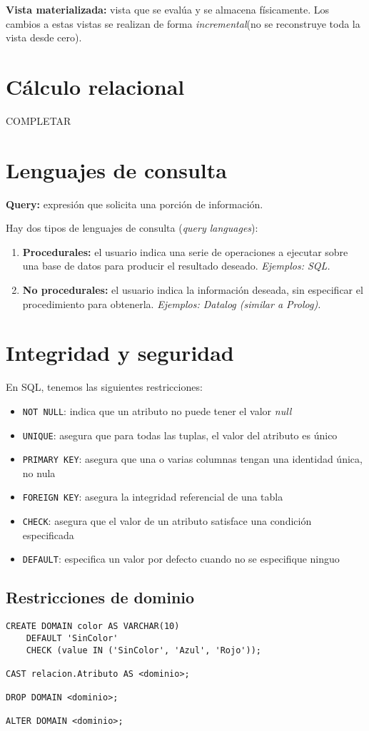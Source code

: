 \documentclass[a4paper, twoside]{article}
\begin{document}
\textbf{Vista materializada:} vista que se evalúa y se almacena físicamente. Los cambios a estas vistas se realizan de forma \emph{incremental}(no se reconstruye toda la vista desde cero).

\section{Cálculo relacional}
COMPLETAR

\section{Lenguajes de consulta}
\textbf{Query:} expresión que solicita una porción de información.

Hay dos tipos de lenguajes de consulta (\emph{query languages}):
\begin{enumerate}
	\item \textbf{Procedurales:} el usuario indica una serie de operaciones a ejecutar sobre una base de datos para producir el resultado deseado. \emph{Ejemplos: SQL.}
	\item \textbf{No procedurales:} el usuario indica la información deseada, sin especificar el procedimiento para obtenerla. \emph{Ejemplos: Datalog (similar a Prolog).}
\end{enumerate}

\section{Integridad y seguridad}
En SQL, tenemos las siguientes restricciones:
\begin{itemize}
	\item \texttt{NOT NULL}: indica que un atributo no puede tener el valor \emph{null}
	\item \texttt{UNIQUE}: asegura que para todas las tuplas, el valor del atributo es único
	\item \texttt{PRIMARY KEY}: asegura que una o varias columnas tengan una identidad única, no nula
	\item \texttt{FOREIGN KEY}: asegura la integridad referencial de una tabla
	\item \texttt{CHECK}: asegura que el valor de un atributo satisface una condición especificada
	\item \texttt{DEFAULT}: especifica un valor por defecto cuando no se especifique ninguo
\end{itemize}

\subsection{Restricciones de dominio}
\begin{lstlisting}
CREATE DOMAIN color AS VARCHAR(10)
	DEFAULT 'SinColor'
	CHECK (value IN ('SinColor', 'Azul', 'Rojo'));

CAST relacion.Atributo AS <dominio>;

DROP DOMAIN <dominio>;

ALTER DOMAIN <dominio>;
\end{lstlisting}
\end{document}
